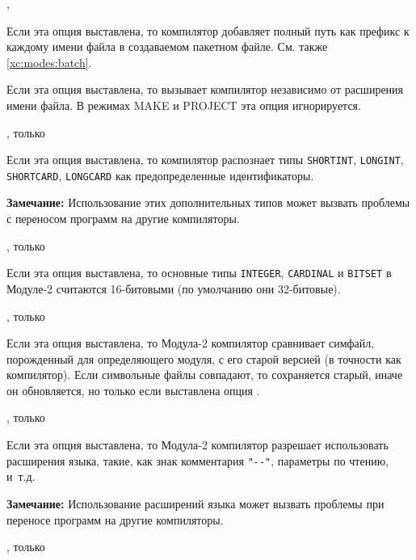 \begin{description}
        \MLBegin{}\ModeM{},\ModeP{}\MLEnd{}

Если эта опция выставлена, то компилятор добавляет полный путь как префикс
к каждому имени файла в создаваемом пакетном файле.
См. также \ref{xc:modes:batch}.

        \MLBegin{}\ModeC{}\MLEnd{}

Если эта опция выставлена, то \xds{} 
вызывает \mt{} компилятор независимо от расширения имени файла.
В режимах MAKE и PROJECT эта опция игнорируется.


        \MLBegin{}\ModeC{}, только \mt{} \MLEnd{} \header

Если эта опция выставлена, то компилятор распознает типы
{\tt SHORTINT}, {\tt LONGINT}, {\tt SHORTCARD}, {\tt LONGCARD}
как предопределенные идентификаторы.

{\bf Замечание:} Использование этих дополнительных типов
может вызвать проблемы с переносом программ на другие компиляторы.

        \MLBegin{}\ModeC{}, только \mt{}\MLEnd{} \header

Если эта опция выставлена, то основные типы
{\tt INTEGER}, {\tt CARDINAL} и {\tt BITSET} в Модуле-2
считаются 16-битовыми (по умолчанию они 32-битовые).

        \MLBegin{}\ModeC{}, только \mt{}\MLEnd{}

Если эта опция выставлена, то Модула-2 компилятор сравнивает 
симфайл, порожденный для определяющего модуля, с его старой
версией (в точности как  \ot{} компилятор). Если символьные файлы 
совпадают, то сохраняется старый, иначе он обновляется, но только 
если выставлена опция .

        \MLBegin{}\ModeC{}, только\mt{}\MLEnd{} \header

Если эта опция выставлена, то Модула-2 компилятор разрешает
использовать расширения языка, такие, как знак комментария
\verb|"--"|, параметры по чтению, и~т.д.

{\bf Замечание:} Использование расширений языка может вызвать 
проблемы при переносе программ на другие компиляторы.

        \MLBegin{}\ModeC{}, только \ot{}\MLEnd{} \header


\end{description}
